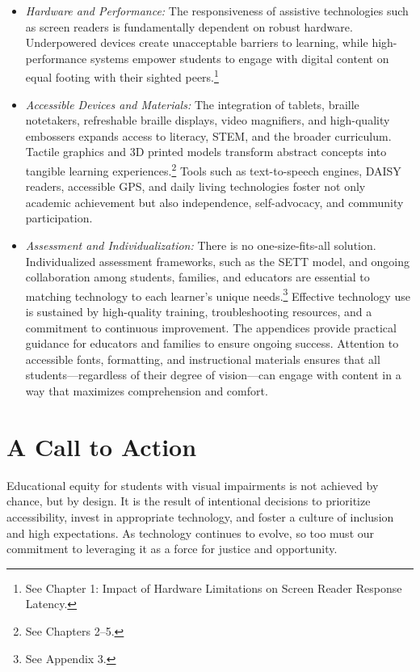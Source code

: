 \begin{itemize}
    \item \emph{Hardware and Performance:} The responsiveness of assistive technologies such as screen readers is fundamentally dependent on robust hardware. Underpowered devices create unacceptable barriers to learning, while high-performance systems empower students to engage with digital content on equal footing with their sighted peers.\footnote{See Chapter 1: Impact of Hardware Limitations on Screen Reader Response Latency.}
    \item \emph{Accessible Devices and Materials:} The integration of tablets, braille notetakers, refreshable braille displays, video magnifiers, and high-quality embossers expands access to literacy, STEM, and the broader curriculum. Tactile graphics and 3D printed models transform abstract concepts into tangible learning experiences.\footnote{See Chapters 2–5.}
    Tools such as text-to-speech engines, DAISY readers, accessible GPS, and daily living technologies foster not only academic achievement but also independence, self-advocacy, and community participation. \cite{Chapters6to8}
    \item \emph{Assessment and Individualization:} There is no one-size-fits-all solution. Individualized assessment frameworks, such as the SETT model, and ongoing collaboration among students, families, and educators are essential to matching technology to each learner’s unique needs.\footnote{See Appendix 3.}
    Effective technology use is sustained by high-quality training, troubleshooting resources, and a commitment to continuous improvement. The appendices provide practical guidance for educators and families to ensure ongoing success. \cite{Appendices1to4}
    Attention to accessible fonts, formatting, and instructional materials ensures that all students—regardless of their degree of vision—can engage with content in a way that maximizes comprehension and comfort. \cite{Appendix5}
\end{itemize}

\section{A Call to Action}
\label{sec:conclusion-call-to-action}

Educational equity for students with visual impairments is not achieved by chance, but by design. It is the result of intentional decisions to prioritize accessibility, invest in appropriate technology, and foster a culture of inclusion and high expectations. As technology continues to evolve, so too must our commitment to leveraging it as a force for justice and opportunity.

